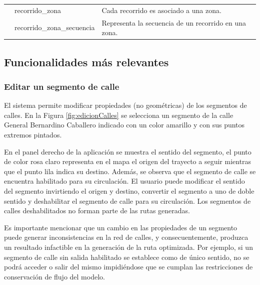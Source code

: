 \begin{table}[]
{\begin{tabular}{lll}
                                                                                                 & recorrido\_zona            & Cada recorrido es asociado a una zona.                                                                                                                             \\
                                                                                                 & recorrido\_zona\_secuencia & Representa la secuencia de un recorrido en una zona.                                                                                                               \\ \hline
\end{tabular}%
}
\end{table}

\subsection{Funcionalidades más relevantes}

\subsubsection{Editar un segmento de calle}

El sistema permite modificar propiedades (no geométricas) de los segmentos de calles. En la Figura \ref{fig:edicionCalles} se selecciona un segmento de la calle General Bernardino Caballero indicado con un color amarillo y con sus puntos extremos pintados.

En el panel derecho de la aplicación se muestra el sentido del segmento, el punto de color rosa claro representa en el mapa el origen del trayecto a seguir mientras que el punto lila indica su destino. Además, se observa que el segmento de calle se encuentra habilitado para su circulación. El usuario puede modificar el sentido del segmento invirtiendo el origen y destino, convertir el segmento a uno de doble sentido y deshabilitar el segmento de calle para su circulación. Los segmentos de calles deshabilitados no forman parte de las rutas generadas.
 
Es importante mencionar que un cambio en las propiedades de un segmento puede generar inconsistencias en la red de calles, y consecuentemente, produzca un resultado infactible en la generación de la ruta optimizada. Por ejemplo, si un segmento de calle sin salida habilitado se establece como de único sentido, no se podrá acceder o salir del mismo impidiéndose que se cumplan las restricciones de conservación de flujo del modelo.

